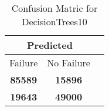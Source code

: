 \begin{table}[] 
\caption{Confusion Matric for DecisionTrees10} 
\label{Table: Prediction Accuracy-DMDDecisionTrees10OnlySunEKF-ignoreReflectionEKF-top2-Reflection} 
\centering 
\begin{tabular} 
 {@{}ccc@{}} 
\toprule 
\multicolumn{2}{c}{\textbf{Predicted}}
 \\ \midrule 
\multicolumn{1}{|c|}{Failure} & 
\multicolumn{1}{c|}{No Failure}
 \\ \midrule 
\multicolumn{1}{|c|}{\color{green}\textbf{85589}} & 
\multicolumn{1}{c|}{\color{red}\textbf{15896}}
 \\ \midrule 
\multicolumn{1}{|c|}{\color{red}\textbf{19643}} & 
\multicolumn{1}{c|}{\color{green}\textbf{49000}}
 \\ \bottomrule 
\end{tabular} 
\end{table} 
